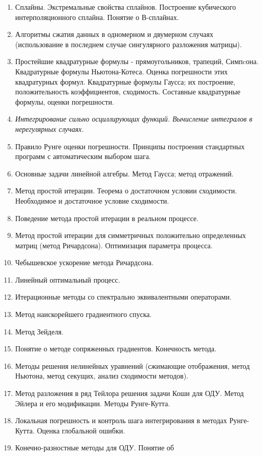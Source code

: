 \documentclass[a4paper]{article}
\begin{document}
\begin{enumerate}
\item Сплайны. Экстремальные свойства сплайнов. Построение кубического
  интерполяционного сплайна. Понятие о В-сплайнах.
\item Алгоритмы сжатия данных в одномерном и двумерном случаях
  (использование в последнем случае сингулярного разложения матрицы).
\item Простейшие квадратурные формулы - прямоугольников, трапеций,
  Симпcона. Квадратурные формулы Ньютона-Котеса. Оценка погрешности
  этих квадратурных формул. Квадратурные формулы Гаусса; их
  построение, положительность коэффициентов, сходимость. Составные
  квадратурные формулы, оценки погрешности.
\item {\it Интегрирование сильно осциллирующих функций. Вычисление
  интегралов в нерегулярных случаях.}
\item Правило Рунге оценки погрешности. Принципы построения
  стандартных программ с автоматическим выбором шага.
\item Основные задачи линейной алгебры. Метод Гаусса; метод отражений.
\item Метод простой итерации. Теорема о достаточном условии
  сходимости. Необходимое и достаточное условие сходимости.
\item Поведение метода простой итерации в реальном процессе.
\item Метод простой итерации для симметричных положительно
  определенных матриц (метод Ричардсона). Оптимизация параметра
  процесса.
\item Чебышевское ускорение метода Ричардсона.
\item Линейный оптимальный процесс.
\item Итерационные методы со спектрально эквивалентными операторами.
\item Метод наискорейшего градиентного спуска.
\item Метод Зейделя.
\item Понятие о методе сопряженных градиентов. Конечность метода.
\item Методы решения нелинейных уравнений (сжимающие отображения,
  метод Ньютона, метод секущих, анализ сходимости методов).
\item Метод разложения в ряд Тейлора решения задачи Коши для
  ОДУ. Метод Эйлера и его модификации. Методы Рунге-Кутта.
\item Локальная погрешность и контроль шага интегрирования в методах
  Рунге-Кутта.  Оценка глобальной ошибки.
\item Конечно-разностные методы для ОДУ. Понятие об

\end{enumerate}
\end{document}
